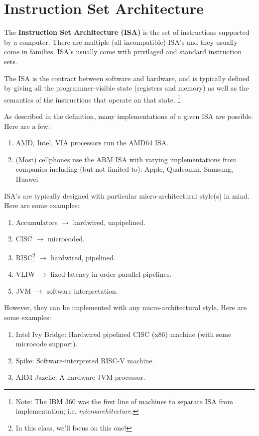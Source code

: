 \documentclass{report}
\newcommand{\definition}[2]{\begin{tcolorbox}[title={Definition: #1}]{#2}\end{tcolorbox}}
\newcommand{\corollary}[2]{\begin{tcolorbox}[colback=teal!5!white,colframe=black!75!teal,title={Corollary:
      #1}]{#2}\end{tcolorbox}}
\begin{document}
\chapter{Instruction Set Architecture}
\definition{Instruction Set Architecture}{
  The \textbf{Instruction Set Architecture (ISA)} is the set of instructions supported by a
  computer. There are multiple (all incompatible) ISA's and they usually come in families. ISA's
  usually come with privilaged and standard instruction sets. 
}

The ISA is the contract between software and hardware, and is typically defined by giving all the
programmer-visible state (registers and memory) as well as the semantics of the instructions that
operate on that state. \footnote{Note: The IBM 360 was the first line of machines to separate ISA
from implementation; i.e. \textit{microarchitecture}.}

As described in the definition, many implementations of a given ISA are possible. Here are a few:

\begin{enumerate}[label=\textit{(\roman*)}] 
\item AMD, Intel, VIA processors run the AMD64 ISA.
\item (Most) cellphones use the ARM ISA with varying implementations from companies including (but not
  limited to): Apple, Qualcomm, Samsung, Huawei
\end{enumerate}





\corollary{Design Methodology}{
  ISA's are typically designed with particular micro-architectural style(s) in mind. Here are some
  examples: 

  \begin{enumerate}[label=\textit{(\roman*)}] 
  \item Accumulators $\to$ hardwired, unpipelined.
  \item CISC $\to$ microcoded.
  \item RISC\footnote{In this class, we'll focus on this one!} $\to$ hardwired, pipelined.
  \item VLIW $\to$ fixed-latency in-order parallel pipelines.
  \item JVM $\to$ software interpretation.
  \end{enumerate}
  However, they can be implemented with any micro-architectural style. Here are some examples:
  
  \begin{enumerate}[label=\textit{(\roman*)}] 
  \item Intel Ivy Bridge: Hardwired pipelined CISC (x86) machine (with some microcode support).
  \item Spike: Software-interpreted RISC-V machine.
  \item ARM Jazelle: A hardware JVM processor.
  \end{enumerate}
}
\end{document}
